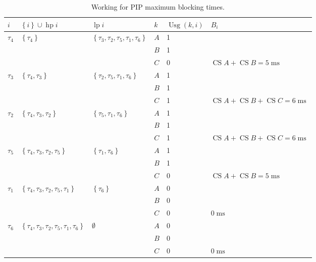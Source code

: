 \documentclass{article}
\numberwithin{equation}{section}
\numberwithin{table}{section}
\numberwithin{figure}{section}
\DeclareMathOperator\mls{ms}
\DeclareMathOperator\hp{hp}
\DeclareMathOperator\lp{lp}
\DeclareMathOperator\usage{Usg}
\DeclareMathOperator\cs{CS}
\begin{document}
\begin{enumerate}
        \begin{table}[p]
            \centering%
            \begin{tabular}{llllll}
                $i$ &
                    $\left\{ i \right\} \cup \hp{i}$ &
                    $\lp{i}$ &
                    $k$ &
                    $\usage{(k,i)}$ &
                    $B_i$ \\
                \toprule
                $\tau_4$ & $\left\{ \tau_4 \right\}$ & $\left\{ \tau_3, \tau_2,
                    \tau_5, \tau_1, \tau_6 \right\}$ & $A$ & 1 \\
                & & & $B$ & 1 \\
                & & & $C$ & 0 & $\cs{A} + \cs{B} = 5\mls$ \\
                \midrule
                $\tau_3$ & $\left\{ \tau_4, \tau_3 \right\}$ & $\left\{ \tau_2,
                    \tau_5, \tau_1, \tau_6 \right\}$ & $A$ & 1 \\
                & & & $B$ & 1 \\
                & & & $C$ & 1 & $\cs{A} + \cs{B} + \cs{C} = 6\mls$ \\
                \midrule
                $\tau_2$ & $\left\{ \tau_4, \tau_3, \tau_2 \right\}$ &
                    $\left\{ \tau_5, \tau_1, \tau_6 \right\}$ & $A$ & 1 \\
                & & & $B$ & 1 \\
                & & & $C$ & 1 & $\cs{A} + \cs{B} + \cs{C} = 6\mls$ \\
                \midrule
                $\tau_5$ & $\left\{ \tau_4, \tau_3, \tau_2, \tau_5 \right\}$ &
                    $\left\{ \tau_1, \tau_6 \right\}$ & $A$ & 1 \\
                & & & $B$ & 1 \\
                & & & $C$ & 0 & $\cs{A} + \cs{B} = 5\mls$ \\
                \midrule
                $\tau_1$ & $\left\{ \tau_4, \tau_3, \tau_2, \tau_5, \tau_1
                    \right\}$ & $\left\{ \tau_6 \right\}$ & $A$ & 0 \\
                & & & $B$ & 0 \\
                & & & $C$ & 0 & $0\mls$ \\
                \midrule
                $\tau_6$ & $\left\{ \tau_4, \tau_3, \tau_2, \tau_5, \tau_1,
                    \tau_6 \right\}$ & $\emptyset$ & $A$ & 0 \\
                & & & $B$ & 0 \\
                & & & $C$ & 0 & $0\mls$ \\
                \bottomrule
            \end{tabular}
            \caption{Working for PIP maximum blocking times.}%
            \label{table:pip-working}
        \end{table}


\end{enumerate}
\end{document}
